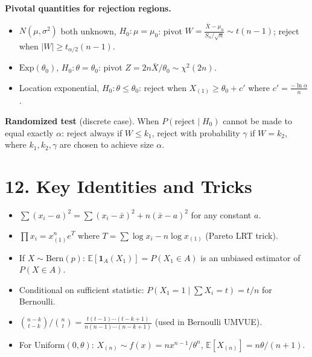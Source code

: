\documentclass[11pt]{article}
\newcommand{\bbE}{\mathbb{E}}
\begin{document}
\medskip
\noindent\textbf{Pivotal quantities for rejection regions.}
\begin{itemize}
  \item $N(\mu,\sigma^2)$ both unknown, $H_0:\mu=\mu_0$: pivot
    $W=\frac{\bar X-\mu_0}{S_n/\sqrt{n}}\sim t(n-1)$; reject when
    $|W|\geq t_{\alpha/2}(n-1)$.
  \item $\mathrm{Exp}(\theta_0)$, $H_0:\theta=\theta_0$: pivot
    $Z=2n\bar X/\theta_0\sim\chi^2(2n)$.
  \item Location exponential, $H_0:\theta\leq\theta_0$: reject when
    $X_{(1)}\geq\theta_0+c'$ where $c'=\frac{-\ln\alpha}{n}$.
\end{itemize}

\medskip
\noindent\textbf{Randomized test} (discrete case). When
$P(\text{reject}\mid H_0)$ cannot be made to equal exactly $\alpha$:
reject always if $W\leq k_1$, reject with probability $\gamma$ if
$W=k_2$, where $k_1,k_2,\gamma$ are chosen to achieve size $\alpha$.

\section*{12.\; Key Identities and Tricks}

\begin{itemize}
  \item $\sum(x_i-a)^2 = \sum(x_i-\bar x)^2 + n(\bar x-a)^2$ for any
    constant $a$.
  \item $\prod x_i = x_{(1)}^n e^T$ where $T=\sum\log x_i - n\log
    x_{(1)}$ (Pareto LRT trick).
  \item If $X\sim\mathrm{Bern}(p)$: $\bbE[\mathbf{1}_A(X_1)]=P(X_1\in
    A)$ is an unbiased estimator of $P(X\in A)$.
  \item Conditional on sufficient statistic: $P(X_1=1\mid\sum X_i=t)
    = t/n$ for Bernoulli.
  \item $\binom{n-k}{t-k}/\binom{n}{t} =
    \frac{t(t-1)\cdots(t-k+1)}{n(n-1)\cdots(n-k+1)}$ (used in Bernoulli UMVUE).
  \item For Uniform$(0,\theta)$: $X_{(n)}\sim
    f(x)=nx^{n-1}/\theta^n$, $\bbE[X_{(n)}]=n\theta/(n+1)$.
\end{itemize}
\end{document}
